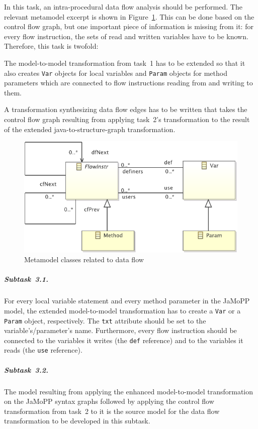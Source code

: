 \documentclass[submission]{eptcs}
\begin{document}
In this task, an intra-procedural data flow analysis should be performed.  The
relevant metamodel excerpt is shown in Figure~\ref{fig:data-flow-mm}.  This can
be done based on the control flow graph, but one important piece of information
is missing from it: for every flow instruction, the sets of read and written
variables have to be known.  Therefore, this task is twofold:

\begin{compactenum}
\item The model-to-model transformation from task~1 has to be extended so that
  it also creates \verb|Var| objects for local variables and \verb|Param|
  objects for method parameters which are connected to flow instructions
  reading from and writing to them.
\item A transformation synthesizing data flow edges has to be written that
  takes the control flow graph resulting from applying task~2's transformation
  to the result of the extended java-to-structure-graph transformation.
\end{compactenum}

\begin{figure}[h!]
  \centering
  \includegraphics[width=0.5\linewidth]{DataFlowGraph}
  \caption{Metamodel classes related to data flow}
  \label{fig:data-flow-mm}
\end{figure}

\subparagraph{Subtask~3.1.}
\label{sec:subtask-3.1}

For every local variable statement and every method parameter in the JaMoPP
model, the extended model-to-model transformation has to create a \verb|Var| or
a \verb|Param| object, respectively.  The \verb|txt| attribute should be set to
the variable's/parameter's name.  Furthermore, every flow instruction should be
connected to the variables it writes (the \verb|def| reference) and to the
variables it reads (the \verb|use| reference).


\subparagraph{Subtask~3.2.}
\label{sec:subtask-3.2}

The model resulting from applying the enhanced model-to-model transformation on
the JaMoPP syntax graphs followed by applying the control flow transformation
from task~2 to it is the source model for the data flow transformation to be
developed in this subtask.
\end{document}
